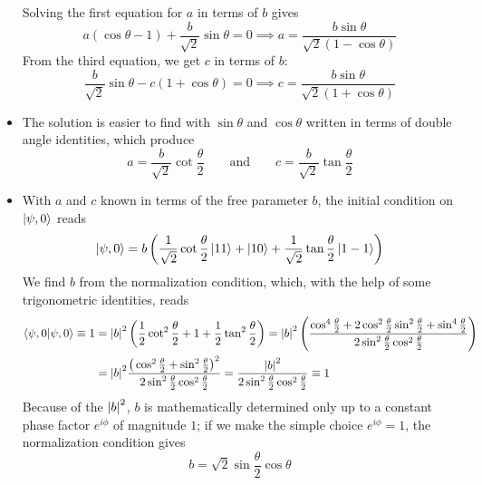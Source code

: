 \documentclass[11pt, a4paper]{article}
\newcommand{\eqtext}[1]{\qquad \text{#1} \qquad}
\begin{document}
\begin{itemize}
	Solving the first equation for $ a $ in terms of $ b $ gives
	\begin{equation*}
		a(\cos \theta - 1) + \frac{b}{\sqrt{2}} \sin \theta = 0 \implies a = \frac{b\sin \theta}{\sqrt{2}(1 - \cos \theta)}
	\end{equation*}
	From the third equation, we get $ c $ in terms of $ b $:
	\begin{equation*}
		\frac{b}{\sqrt{2}}\sin \theta - c(1 + \cos \theta) = 0 \implies c = \frac{b\sin \theta}{\sqrt{2}(1 + \cos \theta)}
	\end{equation*}
	
	\item The solution is easier to find with $ \sin \theta  $ and $ \cos \theta $ written in terms of double angle identities, which produce
	\begin{equation*}
		 a = \frac{b}{\sqrt{2}
		 }\cot \frac{\theta}{2} \eqtext{and}  c = \frac{b}{\sqrt{2}}\tan \frac{\theta}{2} 
	\end{equation*}
	
	\item With $ a $ and $ c $ known in terms of the free parameter $ b $, the initial condition on $ \ket{\psi, 0} $ reads
	\begin{equation*}
		\ket{\psi, 0} = b\left(\frac{1}{\sqrt{2}}\cot \frac{\theta}{2}\ket{11} + \ket{10} + \frac{1}{\sqrt{2}}\tan \frac{\theta}{2}\ket{1-1}  \right)
	\end{equation*}
	We find $ b $ from the normalization condition, which, with the help of some trigonometric identities, reads
	\begin{align*}
		\braket{\psi, 0}{\psi, 0} \equiv 1 &= \abs{b}^{2}\left(\frac{1}{2}\cot^{2}\frac{\theta}{2} + 1 + \frac{1}{2}\tan^{2}\frac{\theta}{2} \right) = \abs{b}^{2}\left(\frac{\cos^{4}\frac{\theta}{2} + 2 \cos^{2}\frac{\theta}{2}\sin^{2}\frac{\theta}{2} + \sin^{4}\frac{\theta}{2}}{2\sin^{2}\frac{\theta}{2}\cos^{2}\frac{\theta}{2}}\right)\\
		&=\abs{b}^{2}\frac{\big(\cos^{2}\frac{\theta}{2} + \sin^{2}\frac{\theta}{2}\big)^{2}}{2 \sin^{2}\frac{\theta}{2} \cos^{2}\frac{\theta}{2}}  = \frac{\abs{b}^{2}}{2 \sin^{2}\frac{\theta}{2} \cos^{2}\frac{\theta}{2}} \equiv 1
	\end{align*}
	Because of the $ \abs{b}^{2} $, $ b $ is mathematically determined only up to a constant phase factor $ e^{i\phi} $ of magnitude $ 1 $; if we make the simple choice $ e^{i\phi} = 1 $, the normalization condition gives
	\begin{equation*}
		b = \sqrt{2}\sin \frac{\theta}{2} \cos \theta
	\end{equation*}
	

\end{itemize}
\end{document}
